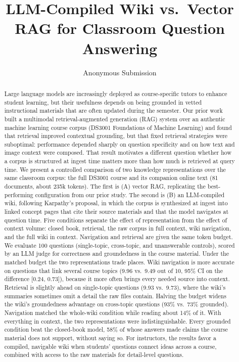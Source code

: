\documentclass[letterpaper]{article} %
\title{LLM-Compiled Wiki vs.\ Vector RAG for Classroom Question Answering}
\author{Anonymous Submission}
\begin{document}
\maketitle

\begin{abstract}
Large language models are increasingly deployed as course-specific tutors to enhance student learning, but their usefulness depends on being grounded in vetted instructional materials that are often updated during the semester. Our prior work built a multimodal retrieval-augmented generation (RAG) system over an authentic machine learning course corpus (DS3001 Foundations of Machine Learning) and found that retrieval improved contextual grounding, but that fixed retrieval strategies were suboptimal: performance depended sharply on question specificity and on how text and image context were composed. That result motivates a different question whether how a corpus is structured at ingest time matters more than how much is retrieved at query time. We present a controlled comparison of two knowledge representations over the same classroom corpus: the full DS3001 course and its companion online text (81 documents, about 235k tokens). The first is (A) vector RAG, replicating the best-performing configuration from our prior study. The second is (B) an LLM-compiled wiki, following Karpathy's proposal, in which the corpus is synthesized at ingest into linked concept pages that cite their source materials and that the model navigates at question time. Five conditions separate the effect of representation from the effect of context volume: closed book, retrieval, the raw corpus in full context, wiki navigation, and the full wiki in context. Navigation and retrieval are given the same token budget. We evaluate 100 questions (single-topic, cross-topic, and unanswerable controls), scored by an LLM judge for correctness and groundedness in the course material. Under the matched budget the two representations trade places. Wiki navigation is more accurate on questions that link several course topics (9.96 vs.\ 9.49 out of 10, 95\% CI on the difference [0.24, 0.73]), because it more often brings every needed source into context. Retrieval is slightly ahead on single-topic questions (9.93 vs.\ 9.73), where the wiki's summaries sometimes omit a detail the raw files contain. Halving the budget widens the wiki's groundedness advantage on cross-topic questions (93\% vs.\ 73\% grounded). Navigation matched the whole-wiki condition while reading about 14\% of it. With everything in context, the two representations were indistinguishable. Every grounded condition beat the closed-book model, 58\% of whose answers made claims the course material does not support, without saying so. For instructors, the results favor a compiled, navigable wiki when students' questions connect ideas across a course, combined with access to the raw materials for detail-level questions.
\end{abstract}
\end{document}
